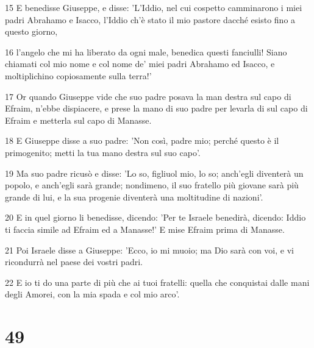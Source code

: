 \par 15 E benedisse Giuseppe, e disse: 'L'Iddio, nel cui cospetto camminarono i miei padri Abrahamo e Isacco, l'Iddio ch'è stato il mio pastore dacché esisto fino a questo giorno,
\par 16 l'angelo che mi ha liberato da ogni male, benedica questi fanciulli! Siano chiamati col mio nome e col nome de' miei padri Abrahamo ed Isacco, e moltiplichino copiosamente sulla terra!'
\par 17 Or quando Giuseppe vide che suo padre posava la man destra sul capo di Efraim, n'ebbe dispiacere, e prese la mano di suo padre per levarla di sul capo di Efraim e metterla sul capo di Manasse.
\par 18 E Giuseppe disse a suo padre: 'Non così, padre mio; perché questo è il primogenito; metti la tua mano destra sul suo capo'.
\par 19 Ma suo padre ricusò e disse: 'Lo so, figliuol mio, lo so; anch'egli diventerà un popolo, e anch'egli sarà grande; nondimeno, il suo fratello più giovane sarà più grande di lui, e la sua progenie diventerà una moltitudine di nazioni'.
\par 20 E in quel giorno li benedisse, dicendo: 'Per te Israele benedirà, dicendo: Iddio ti faccia simile ad Efraim ed a Manasse!' E mise Efraim prima di Manasse.
\par 21 Poi Israele disse a Giuseppe: 'Ecco, io mi muoio; ma Dio sarà con voi, e vi ricondurrà nel paese dei vostri padri.
\par 22 E io ti do una parte di più che ai tuoi fratelli: quella che conquistai dalle mani degli Amorei, con la mia spada e col mio arco'.

\chapter{49}

